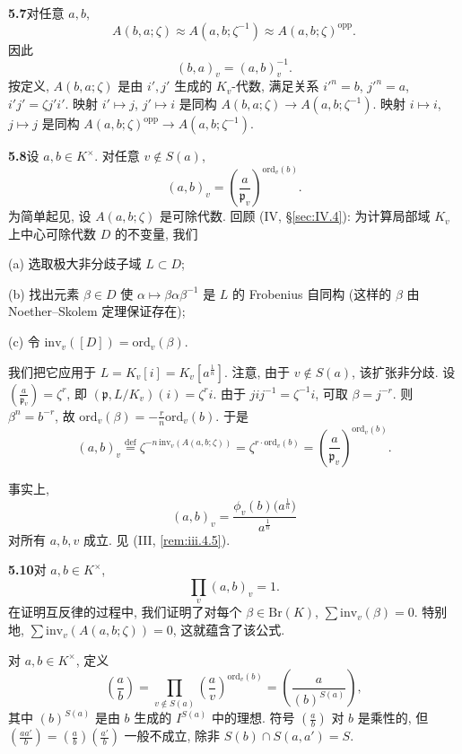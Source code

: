 \noindent\textbf{5.7}\quad 对任意 $a,b$,
\[
A(b,a;\zeta)\approx A(a,b;\zeta^{-1})\approx A(a,b;\zeta)^{\mathrm{opp}}.
\]
因此
\[
(b,a)_{v}=(a,b)_{v}^{-1}.
\]
按定义, $A(b,a;\zeta)$ 是由 $i',j'$ 生成的 $K_v$-代数, 满足关系 $i'^{n}=b$, $j'^{n}=a$, $i'j'=\zeta j'i'$. 映射 $i'\mapsto j$, $j'\mapsto i$ 是同构 $A(b,a;\zeta)\to A(a,b;\zeta^{-1})$. 映射 $i\mapsto i$, $j\mapsto j$ 是同构 $A(a,b;\zeta)^{\mathrm{opp}}\to A(a,b;\zeta^{-1})$.

\noindent{}\hypertarget{item:viii.5.8}{}\textbf{5.8}\quad 设 $a,b\in K^{\times}$. 对任意 $v\notin S(a)$,
\[
(a,b)_{v}=\left(\frac{a}{\mathfrak{p}_{v}}\right)^{\mathrm{ord}_{v}(b)}.
\]
为简单起见, 设 $A(a,b;\zeta)$ 是可除代数. 回顾 (IV, \S \ref{sec:IV.4}): 为计算局部域 $K_v$ 上中心可除代数 $D$ 的不变量, 我们

(a) 选取极大非分歧子域 $L\subset D$;

(b) 找出元素 $\beta\in D$ 使 $\alpha\mapsto\beta\alpha\beta^{-1}$ 是 $L$ 的 Frobenius 自同构 (这样的 $\beta$ 由 Noether--Skolem 定理保证存在);

(c) 令 $\mathrm{inv}_{v}([D])=\mathrm{ord}_{v}(\beta)$.

我们把它应用于 $L=K_v[i]=K_v[a^{\frac{1}{n}}]$. 注意, 由于 $v\notin S(a)$, 该扩张非分歧. 设 $\left(\frac{a}{\mathfrak{p}_v}\right)=\zeta^{r}$, 即 $(\mathfrak{p},L/K_v)(i)=\zeta^{r}i$. 由于 $jij^{-1}=\zeta^{-1}i$, 可取 $\beta=j^{-r}$. 则 $\beta^{n}=b^{-r}$, 故 $\mathrm{ord}_v(\beta)=-\frac{r}{n}\mathrm{ord}_v(b)$. 于是
\[
(a,b)_{v}\overset{\text{def}}{=}\zeta^{-n\,\mathrm{inv}_{v}(A(a,b;\zeta))}=\zeta^{r\cdot\mathrm{ord}_{v}(b)}=\left(\frac{a}{\mathfrak{p}_{v}}\right)^{\mathrm{ord}_{v}(b)}.
\]

\setcounter{theorem}{8}
\begin{remark}\label{rem:viii.5.9}
事实上,
\[
(a,b)_{v}=\frac{\phi_{v}(b)\big(a^{\frac{1}{n}}\big)}{a^{\frac{1}{n}}}
\]
对所有 $a,b,v$ 成立. 见 (III, \ref{rem:iii.4.5}).
\end{remark}

\noindent\textbf{5.10}\quad 对 $a,b\in K^{\times}$,
\[
\prod_{v}(a,b)_{v}=1.
\]
在证明互反律的过程中, 我们证明了对每个 $\beta\in\mathrm{Br}(K)$, $\sum\mathrm{inv}_v(\beta)=0$. 特别地, $\sum\mathrm{inv}_v(A(a,b;\zeta))=0$, 这就蕴含了该公式.

对 $a,b\in K^{\times}$, 定义
\[
\left(\frac{a}{b}\right)=\prod_{v\notin S(a)}\left(\frac{a}{v}\right)^{\mathrm{ord}_{v}(b)}=\left(\frac{a}{(b)^{S(a)}}\right),
\]
其中 $(b)^{S(a)}$ 是由 $b$ 生成的 $I^{S(a)}$ 中的理想. 符号 $\left(\frac{a}{b}\right)$ 对 $b$ 是乘性的, 但 $\left(\frac{aa'}{b}\right)=\left(\frac{a}{b}\right)\left(\frac{a'}{b}\right)$ 一般不成立, 除非 $S(b)\cap S(a,a')=S$.

